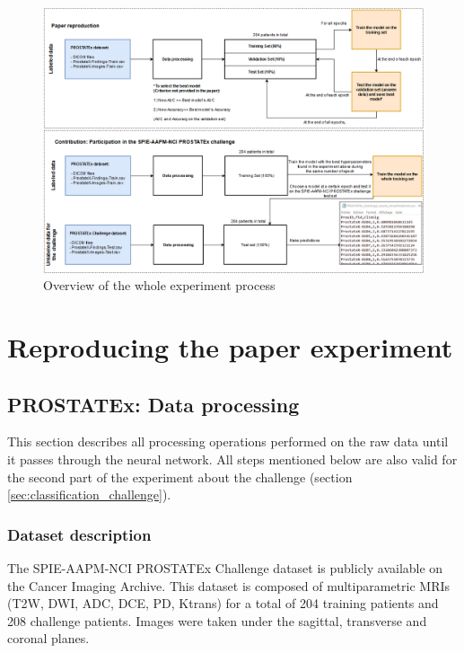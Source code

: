 \begin{figure}[!h]
\centering
\includegraphics[width=1\textwidth, keepaspectratio=true]{./figures/paper_reproduction_process.png}
\caption{Overview of the whole experiment process}
\label{fig:paper_reproduction_process}
\end{figure}

\section{Reproducing the paper experiment}


\subsection{PROSTATEx: Data processing}
\label{sec:prostatex_data_processing}
This section describes all processing operations performed on the raw data until it passes through the neural network. All steps mentioned below are also valid for the second part of the experiment about the challenge (section \ref{sec:classification_challenge}).

\subsubsection{Dataset description}
\label{sec:prostatex_dataset_description}
The SPIE-AAPM-NCI PROSTATEx Challenge dataset is publicly available on the Cancer Imaging Archive. This dataset is composed of multiparametric MRIs (T2W, DWI, ADC, DCE, PD, Ktrans) for a total of 204 training patients and 208 challenge patients. Images were taken under the sagittal, transverse and coronal planes.

